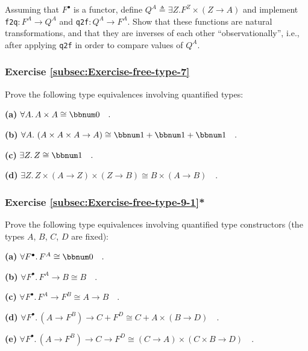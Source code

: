 Assuming that $F^{\bullet}$ is a functor, define $Q^{A}\triangleq\exists Z.F^{Z}\times\left(Z\rightarrow A\right)$
and implement \lstinline!f2q!$:F^{A}\rightarrow Q^{A}$
and \lstinline!q2f!$:Q^{A}\rightarrow F^{A}$.
Show that these functions are natural transformations, and that they
are inverses of each other \textsf{``}observationally\textsf{''}, i.e., after applying
\lstinline!q2f! in order
to compare values of $Q^{A}$.

\subsubsection{Exercise \label{subsec:Exercise-free-type-7}\ref{subsec:Exercise-free-type-7}}

Prove the following type equivalences involving quantified types:

\textbf{(a)} $\forall A.\,A\times A\cong\bbnum 0\quad.$

\textbf{(b)} $\forall A.\,\left(A\times A\times A\rightarrow A\right)\cong\bbnum 1+\bbnum 1+\bbnum 1\quad.$

\textbf{(c)} $\exists Z.\,Z\cong\bbnum 1\quad.$

\textbf{(d)} $\exists Z.\,Z\times\left(A\rightarrow Z\right)\times\left(Z\rightarrow B\right)\cong B\times\left(A\rightarrow B\right)\quad.$

\subsubsection{Exercise \label{subsec:Exercise-free-type-9-1}\ref{subsec:Exercise-free-type-9-1}{*}}

Prove the following type equivalences involving quantified type constructors
(the types $A$, $B$, $C$, $D$ are fixed):

\textbf{(a)} $\forall F^{\bullet}.\,F^{A}\cong\bbnum 0\quad.$

\textbf{(b)} $\forall F^{\bullet}.\,F^{A}\rightarrow B\cong B\quad.$

\textbf{(c)} $\forall F^{\bullet}.\,F^{A}\rightarrow F^{B}\cong A\rightarrow B\quad.$

\textbf{(d)} $\forall F^{\bullet}.\,\left(A\rightarrow F^{B}\right)\rightarrow C+F^{D}\cong C+A\times\left(B\rightarrow D\right)\quad.$

\textbf{(e)} $\forall F^{\bullet}.\,\left(A\rightarrow F^{B}\right)\rightarrow C\rightarrow F^{D}\cong\left(C\rightarrow A\right)\times\left(C\times B\rightarrow D\right)\quad.$

